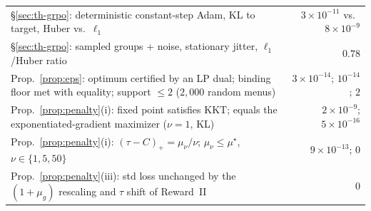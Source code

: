 \begin{center}
\begin{tabular}{p{}r}
\S\ref{sec:th-grpo}: deterministic constant-step Adam, KL to target, Huber vs.\ $\ell_1$ & $3\times10^{-11}$ vs.\ $8\times10^{-9}$ \\
\S\ref{sec:th-grpo}: sampled groups + noise, stationary jitter, $\ell_1$/Huber ratio & $0.78$ \\
Prop.~\ref{prop:eps}: optimum certified by an LP dual; binding floor met with equality; support $\le 2$ ($2{,}000$ random menus) & $3\times10^{-14}$; $10^{-14}$; $2$ \\
Prop.~\ref{prop:penalty}(i): fixed point satisfies KKT; equals the exponentiated-gradient maximizer ($\nu=1$, KL) & $2\times10^{-9}$; $5\times10^{-16}$ \\
Prop.~\ref{prop:penalty}(i): $(\tau-C)_+ = \mu_\nu/\nu$; $\mu_\nu \le \mu^\star$, $\nu\in\{1,5,50\}$ & $9\times10^{-13}$; $0$ \\
Prop.~\ref{prop:penalty}(iii): std loss unchanged by the $(1+\mu_g)$ rescaling and $\tau$ shift of Reward~II & $0$ \\
\bottomrule
\end{tabular}
\end{center}
